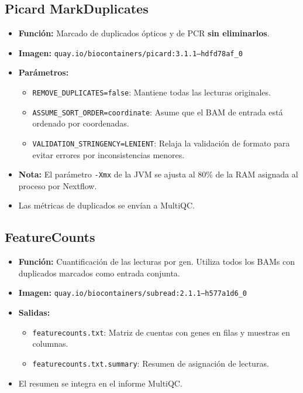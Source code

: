 \documentclass[11pt,a4paper]{article}
\begin{document}
\subsection{Picard MarkDuplicates}
\begin{itemize}
    \item \textbf{Función:} Marcado de duplicados ópticos y de PCR \textbf{sin eliminarlos}.
    \item \textbf{Imagen:} \texttt{quay.io/biocontainers/picard:3.1.1--hdfd78af\_0}
    \item \textbf{Parámetros:}
    \begin{itemize}
        \item \texttt{REMOVE\_DUPLICATES=false}: Mantiene todas las lecturas originales.
        \item \texttt{ASSUME\_SORT\_ORDER=coordinate}: Asume que el BAM de entrada está ordenado por coordenadas.
        \item \texttt{VALIDATION\_STRINGENCY=LENIENT}: Relaja la validación de formato para evitar errores por inconsistencias menores.
    \end{itemize}
    \item \textbf{Nota:} El parámetro \texttt{-Xmx} de la JVM se ajusta al 80\% de la RAM asignada al proceso por Nextflow.
    \item Las métricas de duplicados se envían a MultiQC.
\end{itemize}

\subsection{FeatureCounts}
\begin{itemize}
    \item \textbf{Función:} Cuantificación de las lecturas por gen. Utiliza todos los BAMs con duplicados marcados como entrada conjunta.
    \item \textbf{Imagen:} \texttt{quay.io/biocontainers/subread:2.1.1--h577a1d6\_0}
    \item \textbf{Salidas:}
    \begin{itemize}
        \item \texttt{featurecounts.txt}: Matriz de cuentas con genes en filas y muestras en columnas.
        \item \texttt{featurecounts.txt.summary}: Resumen de asignación de lecturas.
    \end{itemize}
    \item El resumen se integra en el informe MultiQC.
\end{itemize}
\end{document}
